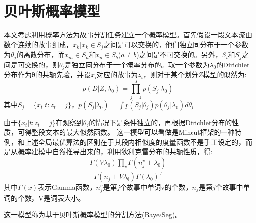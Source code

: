 \section{贝叶斯概率模型}
本文考虑利用概率方法为故事分割任务建立一个概率模型。首先假设一段文本流由数个连续的故事组成，${x_k|x_k \in S_j}$之间是可以交换的，他们独立同分布于一个参数为$\theta_j$的离散分布，而$x_m \in S_a$和$x_n \in S_b$($a \neq b$)之间是不可交换的。另外，$S_i$和$S_j$之间是可交换的，则$\theta_j$是独立同分布于一个概率分布的。取一个参数为$\lambda_0$的Dirichlet分布作为${\bm \theta}$的共轭先验，并设$x_i$对应的故事为$z_i$，则对于某个划分$Z$模型的似然为:
\begin{equation}
p(D|Z,\lambda_0) = \prod_{j=1}^J{p(S_j|\lambda_0)}  
\end{equation}
其中$S_j = \{x_t| t:z_t = j\}$，$p(S_j|\lambda_0)  = \int p(S_j|\theta_j)p(\theta_j|\lambda_0) d \theta_j $

由于$\{x_t| t:z_t = j\}$在观察到$\theta_j$的情况下是条件独立的，再根据Dirichlet分布的性质，可得整段文本的最大似然函数。
这一模型可以看做是Mincut框架的一种特例，和上述全局最优算法的区别在于其段内相似度的度量函数不是手工设定的，而是从概率建模中自然推导出来的，利用狄利克雷分布的共轭性质\cite{heinrich2005parameter}，得:
\begin{equation}
\frac{\Gamma(V\lambda_0)\prod_v\Gamma(n_j^v+\lambda_0)}{\Gamma(n_j+V\lambda_0){\Gamma(\lambda_0)}^V}
\end{equation}
其中$\Gamma(x)$表示Gamma函数，$n_j^v$是第$j$个故事中单词v的个数，$n_j$是第$j$个故事中单词的个数，V是词表大小。

这一模型称为基于贝叶斯概率模型的分割方法(BayesSeg)。

